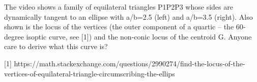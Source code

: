 The video shows a family of equilateral triangles P1P2P3 whose sides are dynamically tangent to an ellipse with a/b=2.5 (left) and a/b=3.5 (right). Also shown is the locus of the vertices (the outer component of a quartic -- the 60-degree isoptic curve, see [1]) and the non-conic locus of the centroid G. Anyone care to derive what this curve is?

[1] https://math.stackexchange.com/questions/2990274/find-the-locus-of-the-vertices-of-equilateral-triangle-circumscribing-the-ellips